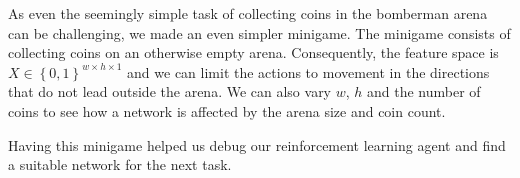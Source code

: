 
As even the seemingly simple task of collecting coins in the bomberman arena can be challenging, we made an even simpler minigame. The minigame consists of collecting coins on an otherwise empty arena. Consequently, the feature space is $X\in\left\{0,1\right\}^{w\times h \times 1}$ and we can limit the actions to movement in the directions that do not lead outside the arena. We can also vary $w$, $h$ and the number of coins to see how a network is affected by the arena size and coin count.

Having this minigame helped us debug our reinforcement learning agent and find a suitable network for the next task.
